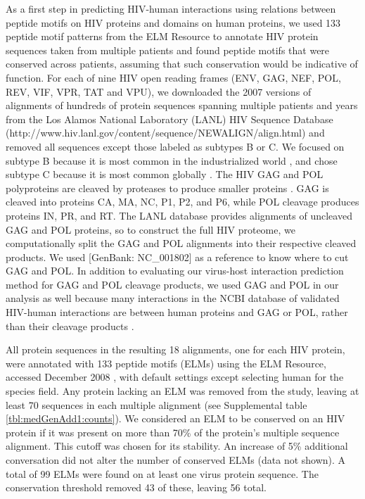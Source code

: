 As a first step in predicting HIV-human interactions using relations
between peptide motifs on HIV proteins and domains on human proteins,
we used 133 peptide motif patterns from the ELM Resource to annotate
HIV protein sequences taken from multiple patients and found peptide
motifs that were conserved across patients, assuming that such
conservation would be indicative of function. For each of nine HIV
open reading frames (ENV, GAG, NEF, POL, REV, VIF, VPR, TAT and VPU),
we downloaded the 2007 versions of alignments of hundreds of protein
sequences spanning multiple patients and years from the Los Alamos
National Laboratory (LANL) HIV Sequence Database
\\ (http://www.hiv.lanl.gov/content/sequence/NEWALIGN/align.html) and
removed all sequences except those labeled as subtypes B or C. We
focused on subtype B because it is most common in the industrialized
world \cite{holmes07}, and chose subtype C because it is most common
globally \cite{hemelarr06}. The HIV GAG and POL polyproteins are
cleaved by proteases to produce smaller proteins
\cite{frankel2003hiv}. GAG is cleaved into proteins CA, MA, NC, P1,
P2, and P6, while POL cleavage produces proteins IN, PR, and RT. The
LANL database provides alignments of uncleaved GAG and POL proteins,
so to construct the full HIV proteome, we computationally split the
GAG and POL alignments into their respective cleaved products. We used
[GenBank: NC\_001802] as a reference to know where to cut GAG and
POL. In addition to evaluating our virus-host interaction prediction
method for GAG and POL cleavage products, we used GAG and POL in our
analysis as well because many interactions in the NCBI database of
validated HIV-human interactions are between human proteins and GAG or
POL, rather than their cleavage products \cite{fu09}.

All protein sequences in the resulting 18 alignments, one for each HIV
protein, were annotated with 133 peptide motifs (ELMs) using the ELM
Resource, accessed December 2008 \cite{puntervoll03}, with default
settings except selecting human for the species field. Any protein
lacking an ELM was removed from the study, leaving at least 70
sequences in each multiple alignment (see Supplemental table
\ref{tbl:medGenAdd1:counts}). We considered an ELM to be conserved on
an HIV protein if it was present on more than 70\% of the protein's
multiple sequence alignment. This cutoff was chosen for its
stability. An increase of 5\% additional conversation did not alter
the number of conserved ELMs (data not shown). A total of 99 ELMs were
found on at least one virus protein sequence. The conservation
threshold removed 43 of these, leaving 56 total.

